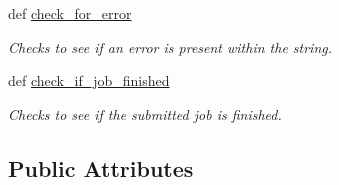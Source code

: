 \begin{DoxyCompactItemize}
def \hyperlink{classauto_1_1_auto_ad2571577ff5fb86d387672d0c7787313}{check\-\_\-for\-\_\-error}
\begin{DoxyCompactList}\small\item\em Checks to see if an error is present within the string. \end{DoxyCompactList}\item 
def \hyperlink{classauto_1_1_auto_a3f4759a3c197d096ac0be94660701b0c}{check\-\_\-if\-\_\-job\-\_\-finished}
\begin{DoxyCompactList}\small\item\em Checks to see if the submitted job is finished. \end{DoxyCompactList}\end{DoxyCompactItemize}
\subsection*{Public Attributes}
